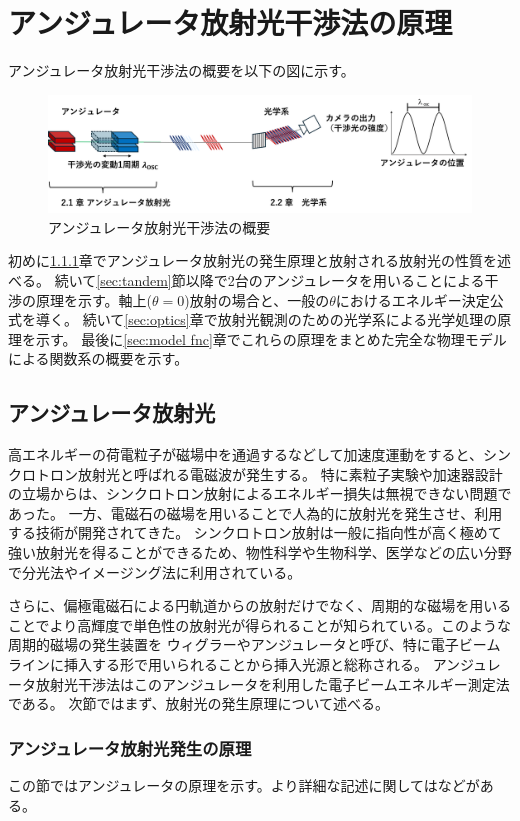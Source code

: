 \documentclass[a4paper,11pt,uplatex]{jsbook}
\begin{document}
\chapter{アンジュレータ放射光干渉法の原理}
アンジュレータ放射光干渉法の概要を以下の図に示す。
\begin{figure}[h]
  \centering
  \includegraphics[width=\linewidth]{image/2-URI.png}
  \caption{アンジュレータ放射光干渉法の概要}
\end{figure}

初めに\ref{sec:undulator}章でアンジュレータ放射光の発生原理と放射される放射光の性質を述べる。
続いて\ref{sec:tandem}節以降で2台のアンジュレータを用いることによる干渉の原理を示す。軸上($\theta =0$)放射の場合と、一般の$\theta$におけるエネルギー決定公式を導く。
続いて\ref{sec:optics}章で放射光観測のための光学系による光学処理の原理を示す。
最後に\ref{sec:model fnc}章でこれらの原理をまとめた完全な物理モデルによる関数系の概要を示す。
\section{アンジュレータ放射光}
高エネルギーの荷電粒子が磁場中を通過するなどして加速度運動をすると、シンクロトロン放射光と呼ばれる電磁波が発生する。
特に素粒子実験や加速器設計の立場からは、シンクロトロン放射によるエネルギー損失は無視できない問題であった。
一方、電磁石の磁場を用いることで人為的に放射光を発生させ、利用する技術が開発されてきた。
シンクロトロン放射は一般に指向性が高く極めて強い放射光を得ることができるため、物性科学や生物科学、医学などの広い分野で分光法やイメージング法に利用されている。

さらに、偏極電磁石による円軌道からの放射だけでなく、周期的な磁場を用いることでより高輝度で単色性の放射光が得られることが知られている。このような周期的磁場の発生装置を
ウィグラーやアンジュレータと呼び、特に電子ビームラインに挿入する形で用いられることから挿入光源と総称される。
アンジュレータ放射光干渉法はこのアンジュレータを利用した電子ビームエネルギー測定法である。
次節ではまず、放射光の発生原理について述べる。

\subsection{アンジュレータ放射光発生の原理}\label{sec:undulator}
この節ではアンジュレータの原理を示す。より詳細な記述に関しては\cite{大柳,walker,clarke}などがある。
\end{document}
